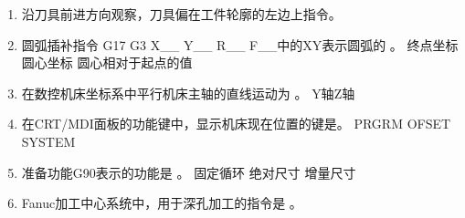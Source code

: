 \documentclass[12pt,twocolumn,landscape,UTF8,twoside]{ctexart}
\begin{document}
\begin{spacing}{1.3}
\begin{enumerate} [1、]
\item 沿刀具前进方向观察，刀具偏在工件轮廓的左边上指令。
\item 圆弧插补指令 G17 G3 X\_\_ Y\_\_ R\_\_ F\_\_中的XY表示圆弧的	。
	{终点坐标}	{圆心坐标}	{圆心相对于起点的值}
\item 在数控机床坐标系中平行机床主轴的直线运动为	。
	{Y轴}{Z轴}
\item 在CRT/MDI面板的功能键中，显示机床现在位置的键是。
	{PRGRM}	{OFSET}	{SYSTEM}
\item 准备功能G90表示的功能是	。
	{固定循环}	{绝对尺寸}	{增量尺寸}
\item Fanuc加工中心系统中，用于深孔加工的指令是		。

\end{enumerate}
\end{spacing}
\end{document}
